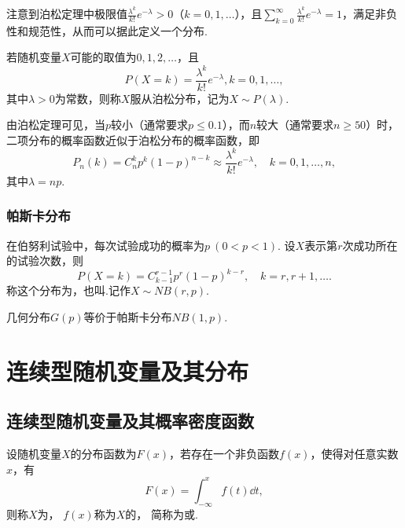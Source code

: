 注意到泊松定理中极限值\(\frac{\lambda^k}{k!} e^{-\lambda} > 0\)（\(k=0,1,\dotsc\)），且\(\sum\limits_{k=0}^\infty \frac{\lambda^k}{k!} e^{-\lambda} = 1\)，满足非负性和规范性，从而可以据此定义一个分布.

\begin{definition}
若随机变量\(X\)可能的取值为\(0,1,2,\dotsc\)，且\begin{equation}\label{equation:随机变量及其分布.泊松分布的分布律}
P(X=k) = \frac{\lambda^k}{k!} e^{-\lambda}, k=0,1,\dotsc,
\end{equation}其中\(\lambda > 0\)为常数，则称\(X\)服从泊松分布，记为\(X \sim P(\lambda)\).
\end{definition}

由泊松定理可见，当\(p\)较小（通常要求\(p \leqslant 0.1\)），而\(n\)较大（通常要求\(n \geqslant 50\)）时，%
二项分布的概率函数近似于泊松分布的概率函数，即\[
P_n(k) = C_n^k p^k (1-p)^{n-k} \approx \frac{\lambda^k}{k!} e^{-\lambda},
\quad k=0,1,\dotsc,n,
\]其中\(\lambda = n p\).

\subsubsection{帕斯卡分布}
\begin{definition}
在伯努利试验中，每次试验成功的概率为\(p\ (0<p<1)\).
设\(X\)表示第\(r\)次成功所在的试验次数，则\begin{equation}
P(X=k) = C_{k-1}^{r-1} p^r (1-p)^{k-r},
\quad k=r,r+1,\dotsc.
\end{equation}称这个分布为，也叫.记作\(X \sim NB(r, p)\).

几何分布\(G(p)\)等价于帕斯卡分布\(NB(1,p)\).
\end{definition}

\section{连续型随机变量及其分布}
\subsection{连续型随机变量及其概率密度函数}
\begin{definition}
设随机变量\(X\)的分布函数为\(F(x)\)，若存在一个非负函数\(f(x)\)，使得对任意实数\(x\)，有\[
F(x) = \int_{-\infty}^x f(t) \dd{t},
\]则称\(X\)为，%
\(f(x)\)称为\(X\)的，%
简称为或.
\end{definition}

